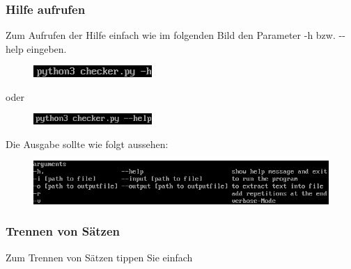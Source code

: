 \documentclass[12pt]{scrartcl}
\begin{document}
\subsubsection{Hilfe aufrufen}
\label{sec:first-steps-help}
Zum Aufrufen der Hilfe einfach wie im folgenden Bild den Parameter -h bzw. -{}-help eingeben.
\newline
\begin{figure}[htbp]
\centering
\includegraphics[width=0.4\textwidth]{ersteSchritteHilfeChecker1}\par\vspace{0.25cm}
\label{fig:ersteSchritteHilfe1}
\end{figure}
\begin{center}
oder
\end{center}
\begin{figure}[htbp]
\centering
\includegraphics[width=0.4\textwidth]{ersteSchritteHilfeChecker2}\par\vspace{0.25cm}
\label{fig:ersteSchritte2}
\end{figure}
Die Ausgabe sollte wie folgt aussehen:
\begin{figure}[htbp]
\centering
\includegraphics[width=1.1\textwidth]{ersteSchritteHilfeChecker3}\par\vspace{0.5cm}
\label{fig:ersteSchritteHilfe3}
\end{figure}
\newpage




\subsubsection{Trennen von Sätzen}
\label{sec:first-steps-extraction-console}
Zum Trennen von Sätzen tippen Sie einfach	
\end{document}
